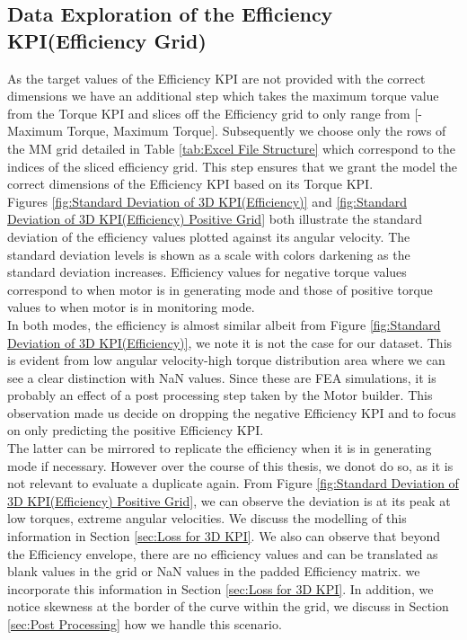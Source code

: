 \documentclass{report} %
\begin{document}
\subsection{Data Exploration of the Efficiency \ac{KPI}(Efficiency Grid)}\label{subsec:Deep Dive into 3D KPI}
As the target values of the Efficiency \ac{KPI} are not provided with the correct dimensions we have an additional step which takes the maximum torque value from the Torque \ac{KPI} 
and slices off the Efficiency grid to only range from [-Maximum Torque, Maximum Torque]. 
Subsequently we choose only the rows of the MM grid detailed in Table \ref{tab:Excel File Structure} which correspond to the indices of the sliced efficiency grid.
This step ensures that we grant the model the correct dimensions of the Efficiency \ac{KPI} based on its Torque \ac{KPI}.\\
Figures \ref{fig:Standard Deviation of 3D KPI(Efficiency)} and \ref{fig:Standard Deviation of 3D KPI(Efficiency) Positive Grid} both illustrate the standard deviation 
of the efficiency values plotted against its angular velocity. The standard deviation levels is shown as a scale with colors darkening as the standard deviation increases.
Efficiency values for negative torque values correspond to when motor is in generating mode and those of positive torque values to when motor is in monitoring mode.\\
In both modes, the efficiency is almost similar albeit from Figure \ref{fig:Standard Deviation of 3D KPI(Efficiency)}, we note it is not the case for our dataset. 
This is evident from low angular velocity-high torque distribution area where we can see a clear distinction with \ac{NaN} values.
Since these are \ac{FEA} simulations, it is probably an effect of a post processing step taken by the Motor builder.
This observation made us decide on dropping the negative Efficiency \ac{KPI} and to focus on only predicting the positive Efficiency \ac{KPI}.\\
The latter can be mirrored to replicate the efficiency when it is in generating mode if necessary.
However over the course of this thesis, we donot do so, as it is not relevant to evaluate a duplicate again.
From Figure \ref{fig:Standard Deviation of 3D KPI(Efficiency) Positive Grid}, we can observe the deviation is at its peak at low torques, extreme angular velocities. 
We discuss the modelling of this information in Section \ref{sec:Loss for 3D KPI}. 
We also can observe that beyond the Efficiency envelope, there are no efficiency values and can be translated as blank values in the grid or \ac{NaN} values in the padded Efficiency matrix.
we incorporate this information in Section \ref{sec:Loss for 3D KPI}.
In addition, we notice skewness at the border of the curve within the grid, we discuss in Section \ref{sec:Post Processing} how we handle this scenario.
\end{document}
